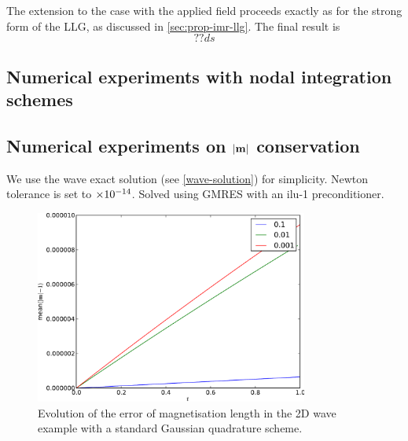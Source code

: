 The extension to the case with the applied field proceeds exactly as for the strong form of the LLG, as discussed in \autoref{sec:prop-imr-llg}.
The final result is
\begin{equation}
  ??ds
\end{equation}

\subsection{Numerical experiments with nodal integration schemes}


\subsection{Numerical experiments on $\left|{\mathbf{m}} \right|$ conservation}

We use the wave exact solution (see \autoref{wave-solution}) for simplicity.
Newton tolerance is set to $\times 10^{-14}$.
Solved using GMRES with an ilu-1 preconditioner.

\begin{figure}[ht!]
  \centering
  \includegraphics[width=0.8\textwidth]{plots/2d_wave_solution_m_length/gauss-meanmathbfm-1vst.pdf}
  \caption{Evolution of the error of magnetisation length in the 2D wave example with a standard Gaussian quadrature scheme.}
  \label{fig:mean-ml-error-2d-gauss}
\end{figure}

